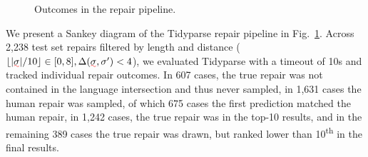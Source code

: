 \documentclass[sigplan,review,acmsmall,nonacm,screen,anonymous]{acmart}\settopmatter{printfolios=false,printccs=false,printacmref=false}
\begin{document}
%

\begin{figure}
\vspace{-1.13cm}
\begin{center}\resizebox{.43\textwidth}{!}{\hspace{-0.6cm}}\end{center}
\vspace{-1.1cm}
\caption{Outcomes in the repair pipeline.}
\label{fig:sankey}
\end{figure}

\noindent We present a Sankey diagram of the Tidyparse repair pipeline in Fig.~\ref{fig:sankey}. Across 2,238 test set repairs filtered by length and distance ($\lfloor|\err\sigma| / 10\rfloor \in [0, 8], \Delta(\err\sigma, \sigma') < 4$), we evaluated Tidyparse with a timeout of 10s and tracked individual repair outcomes. In 607 cases, the true repair was not contained in the language intersection and thus never sampled, in 1,631 cases the human repair was sampled, of which 675 cases the first prediction matched the human repair, in 1,242 cases, the true repair was in the top-10 results, and in the remaining 389 cases the true repair was drawn, but ranked lower than 10\textsuperscript{th} in the final results.
\end{document}
